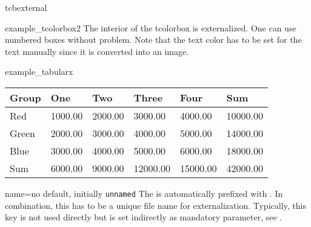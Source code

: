\begin{docEnvironment}[doc new=2015-03-11]{tcbexternal}{}
\begin{dispExample}
\begin{tcolorbox}[nobeforeafter,enhanced,
      fonttitle=\bfseries,title=Externalized Box,
      colframe=blue!50!black,
      interior style={fill overzoom image=blueshade.png}]
  \begin{tcbexternal}[minipage]{example_tcolorbox2}
    \color{white}%
    The interior of the tcolorbox is externalized.
    One can use numbered boxes without problem.
    Note that the text color has to be set for the text manually
    since it is converted into an image.
  \end{tcbexternal}
\end{tcolorbox}
\end{dispExample}

\begin{dispExample}
\begin{tcbexternal}[minipage]{example_tabularx}
  \begin{tabularx}{\linewidth}{|l||Y|Y|Y|Y||Y|}\hline
    Group & One & Two & Three & Four & Sum\\\hline\hline
    Red & 1000.00 & 2000.00 & 3000.00 & 4000.00 & 10000.00\\\hline
    Green & 2000.00 & 3000.00 & 4000.00 & 5000.00 & 14000.00\\\hline
    Blue & 3000.00 & 4000.00 & 5000.00 & 6000.00 & 18000.00\\\hline\hline
    Sum & 6000.00 & 9000.00 & 12000.00 & 15000.00 & 42000.00\\\hline
  \end{tabularx}
\end{tcbexternal}
\end{dispExample}


\end{docEnvironment}

\begin{extTcbKey}[][doc new=2015-03-11]{name}{=}{no default,
  initially \texttt{unnamed}}
The  is automatically prefixed with .
In combination, this has to be a unique file name for externalization.
Typically, this key is not used directly but is set indirectly as
mandatory parameter, see .
\end{extTcbKey}


